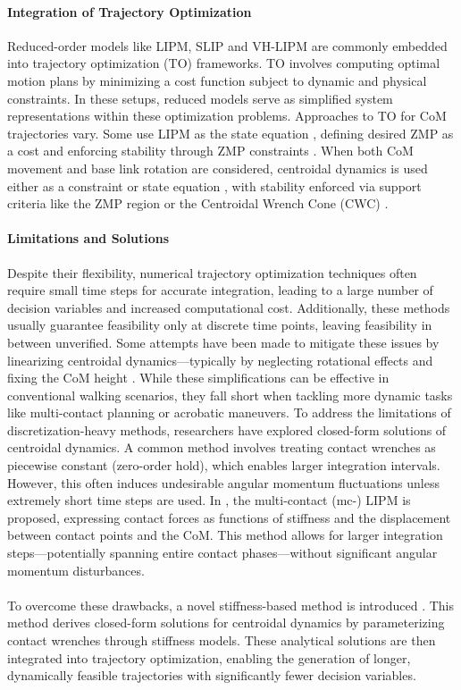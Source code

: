 \documentclass[main.tex]{subfiles}
\begin{document}
\paragraph{Integration of Trajectory Optimization} Reduced-order models like LIPM, SLIP and VH-LIPM are commonly embedded into trajectory optimization (TO) frameworks. TO involves computing optimal motion plans by minimizing a cost function subject to dynamic and physical constraints. In these setups, reduced models serve as simplified system representations within these optimization problems. Approaches to TO for CoM trajectories vary. Some use LIPM as the state equation \cite{englsberger2017smooth, kamioka2018simultaneous}, defining desired ZMP as a cost \cite{tedrake2015closed} and enforcing stability through ZMP constraints \cite{ajita2003biped, murooka2022centroidal}. When both CoM movement and base link rotation are considered, centroidal dynamics is used either as a constraint or state equation \cite{kuindersma2016optimization, rossini2023real}, with stability enforced via support criteria like the ZMP region or the Centroidal Wrench Cone (CWC) \cite{ding2021nonlinear, dai2016planning}.
\begin{sloppypar}
\paragraph{Limitations and Solutions} Despite their flexibility, numerical trajectory optimization techniques often require small time steps for accurate integration, leading to a large number of decision variables and increased computational cost. Additionally, these methods usually guarantee feasibility only at discrete time points, leaving feasibility in between unverified. Some attempts have been made to mitigate these issues by linearizing centroidal dynamics—typically by neglecting rotational effects and fixing the CoM height \cite{audren2014model}. While these simplifications can be effective in conventional walking scenarios, they fall short when tackling more dynamic tasks like multi-contact planning or acrobatic maneuvers. To address the limitations of discretization-heavy methods, researchers have explored closed-form solutions of centroidal dynamics. A common method involves treating contact wrenches as piecewise constant (zero-order hold), which enables larger integration intervals. However, this often induces undesirable angular momentum fluctuations unless extremely short time steps are used. In \cite{tazaki2022fast}, the multi-contact (mc-) LIPM is proposed, expressing contact forces as functions of stiffness and the displacement between contact points and the CoM. This method allows for larger integration steps—potentially spanning entire contact phases—without significant angular momentum disturbances. \\
\\
To overcome these drawbacks, a novel stiffness-based method is introduced \cite{tazaki2024trajectory}. This method derives closed-form solutions for centroidal dynamics by parameterizing contact wrenches through stiffness models. These analytical solutions are then integrated into trajectory optimization, enabling the generation of longer, dynamically feasible trajectories with significantly fewer decision variables.
\end{sloppypar}
\end{document}
